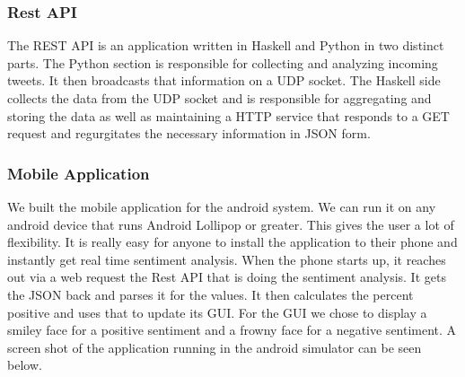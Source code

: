 \documentclass{acm_proc_article-sp}
\begin{document}
\subsubsection{Rest API}

The REST API is an application written in Haskell and Python in two distinct parts. The
Python section is responsible for collecting and analyzing incoming tweets. It then broadcasts
that information on a UDP socket. The Haskell side collects the data from the UDP socket and
is responsible for aggregating and storing the data as well as maintaining a HTTP service that
responds to a GET request and regurgitates the necessary information in JSON form.

\subsubsection{Mobile Application}

We built the mobile application for the android system. We can run it on any
android device that runs Android Lollipop or greater. This gives the user a lot
of flexibility. It is really easy for anyone to install the application to their phone
and instantly get real time sentiment analysis. When the phone starts up, it
reaches out via a web request the Rest API that is doing the sentiment
analysis. It gets the JSON back and parses it for the values. It then
calculates the percent positive and uses that to update its GUI. For the GUI we
chose to display a smiley face for a positive sentiment and a frowny face for a
negative sentiment. A screen shot of the application running in the android simulator
can be seen below.  

\break
\end{document}
